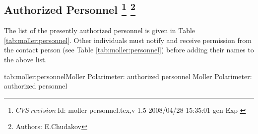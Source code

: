 \begin{safetyen}{0}{0}
\section[Authorized  Personnel]{Authorized  Personnel
\label{sec:moller-pers}
\footnote{
   $CVS~revision~ $Id: moller-personnel.tex,v 1.5 2008/04/28 15:35:01 gen Exp $ $
 }
\footnote{Authors: E.Chudakov }
}
\end{safetyen}
The list
of the presently authorized personnel is given in Table \ref{tab:moller:personnel}.
Other individuals must notify and receive permission from
the contact person (see Table \ref{tab:moller:personnel}) before adding their names 
to the above list.

\begin{namestab}{tab:moller:personnel}{Moller Polarimeter: authorized personnel}{%
   Moller Polarimeter: authorized personnel}
  \OleksandrGlamazdin{}
  \ViktorGorbenko{}
  \RomanPomatsalyuk{}
\end{namestab}
                  


